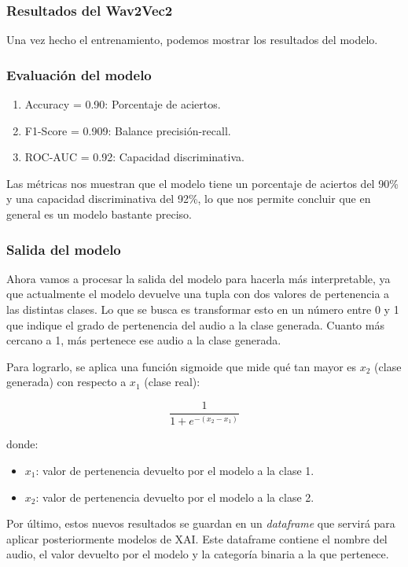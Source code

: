 \subsubsection*{Resultados del Wav2Vec2}

Una vez hecho el entrenamiento, podemos mostrar los resultados del modelo.

\subsubsection*{Evaluación del modelo}

\begin{enumerate}
 \item Accuracy = 0.90: Porcentaje de aciertos.
 \item F1-Score = 0.909: Balance precisión-recall.
 \item ROC-AUC = 0.92: Capacidad discriminativa.
\end{enumerate}

Las métricas nos muestran que el modelo tiene un porcentaje de aciertos del 90\% y una capacidad discriminativa del 92\%, lo que nos permite concluir que en general es un modelo bastante preciso.

\subsubsection*{Salida del modelo}

Ahora vamos a procesar la salida del modelo para hacerla más interpretable, ya que actualmente el modelo devuelve una tupla con dos valores de pertenencia a las distintas clases. Lo que se busca es transformar esto en un número entre 0 y 1 que indique el grado de pertenencia del audio a la clase generada. Cuanto más cercano a 1, más pertenece ese audio a la clase generada.

Para lograrlo, se aplica una función sigmoide que mide qué tan mayor es $x_2$ (clase generada) con respecto a $x_1$ (clase real):

\[
\frac{1}{1 + e^{-(x_2 - x_1)}}
\]

\noindent donde:
\begin{itemize}
 \item $x_1$: valor de pertenencia devuelto por el modelo a la clase 1.
 \item $x_2$: valor de pertenencia devuelto por el modelo a la clase 2.
\end{itemize}

Por último, estos nuevos resultados se guardan en un \textit{dataframe} que servirá para aplicar posteriormente modelos de XAI. Este dataframe contiene el nombre del audio, el valor devuelto por el modelo y la categoría binaria a la que pertenece.

